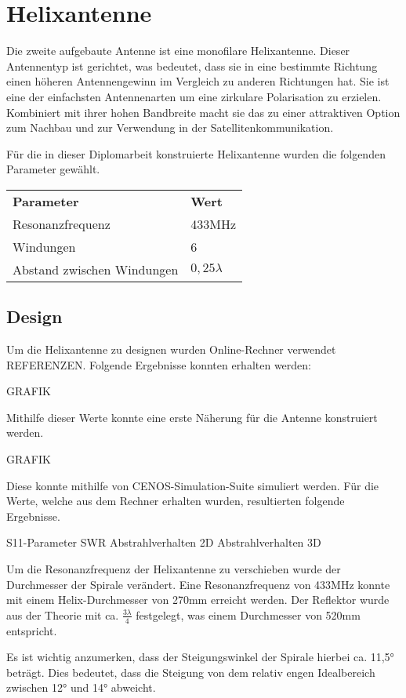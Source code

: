 \chapter{Helixantenne}
Die zweite aufgebaute Antenne ist eine monofilare Helixantenne. Dieser Antennentyp ist gerichtet, was bedeutet, dass sie in eine bestimmte Richtung einen höheren Antennengewinn im Vergleich zu anderen Richtungen hat. Sie ist eine der einfachsten Antennenarten um eine zirkulare Polarisation zu erzielen. Kombiniert mit ihrer hohen Bandbreite macht sie das zu einer attraktiven Option zum Nachbau und zur Verwendung in der Satellitenkommunikation.

Für die in dieser Diplomarbeit konstruierte Helixantenne wurden die folgenden Parameter gewählt.

\begin{tabular}{|l|l|}
	\textbf{Parameter} & \textbf{Wert}\\
	Resonanzfrequenz & 433MHz\\
	Windungen & 6\\
	Abstand zwischen Windungen & $0,25\lambda$
\end{tabular}

\section{Design}
Um die Helixantenne zu designen wurden Online-Rechner verwendet REFERENZEN. Folgende Ergebnisse konnten erhalten werden:

GRAFIK

Mithilfe dieser Werte konnte eine erste Näherung für die Antenne konstruiert werden. 

GRAFIK

Diese konnte mithilfe von CENOS-Simulation-Suite simuliert werden. Für die Werte, welche aus dem Rechner erhalten wurden, resultierten folgende Ergebnisse.

S11-Parameter
SWR
Abstrahlverhalten 2D
Abstrahlverhalten 3D

Um die Resonanzfrequenz der Helixantenne zu verschieben wurde der Durchmesser der Spirale verändert. Eine Resonanzfrequenz von 433MHz konnte mit einem Helix-Durchmesser von 270mm erreicht werden. Der Reflektor wurde aus der Theorie mit ca. $\frac{3\lambda}{4}$ festgelegt, was einem Durchmesser von 520mm entspricht.

Es ist wichtig anzumerken, dass der Steigungswinkel der Spirale hierbei ca. 11,5° beträgt. Dies bedeutet, dass die Steigung von dem relativ engen Idealbereich zwischen 12° und 14° abweicht.

